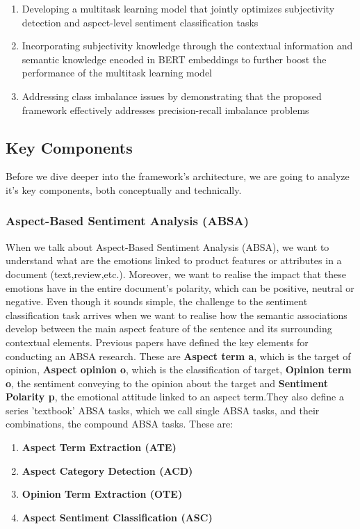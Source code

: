 \documentclass[a4paper,12pt]{article}
\begin{document}
\begin{enumerate}
    \item {Developing a multitask learning model that jointly optimizes subjectivity detection and aspect-level sentiment classification tasks}
    \item {Incorporating subjectivity knowledge through the contextual information and semantic knowledge encoded in BERT embeddings to further boost the performance of the multitask learning model}
    \item {Addressing class imbalance issues by demonstrating that the proposed framework effectively addresses precision-recall imbalance problems}
\end{enumerate}

\subsection{Key Components}
Before we dive deeper into the framework's architecture, we are going to analyze it's key components, both conceptually and technically.
\subsubsection{Aspect-Based Sentiment Analysis (ABSA)}
When we talk about Aspect-Based Sentiment Analysis (ABSA), we want to understand what are the emotions linked to product features or attributes in a document (text,review,etc.). Moreover, we want to realise the impact that these emotions have in the entire document's polarity, which can be positive, neutral or negative. Even though it sounds simple, the challenge to the sentiment classification task arrives when we want to realise how the semantic associations 
develop between the main aspect feature of the sentence and its surrounding contextual elements. Previous papers have defined the key elements for conducting an ABSA research. These are \textbf{Aspect term a}, which is the target of opinion, \textbf{Aspect opinion o}, which is the classification of target, \textbf{Opinion term o}, the sentiment conveying to the opinion about the target and \textbf{Sentiment Polarity p}, the emotional attitude linked to an aspect term.They also define a series 'textbook' ABSA tasks, which we call single ABSA tasks, and their combinations, the compound ABSA tasks. These are:

\begin{enumerate}
    \item \textbf{Aspect Term Extraction (ATE)}
    \item \textbf{Aspect Category Detection (ACD)}
    \item \textbf{Opinion Term Extraction (OTE)}
    \item \textbf{Aspect Sentiment Classification (ASC)}
\end{enumerate}
\end{document}
